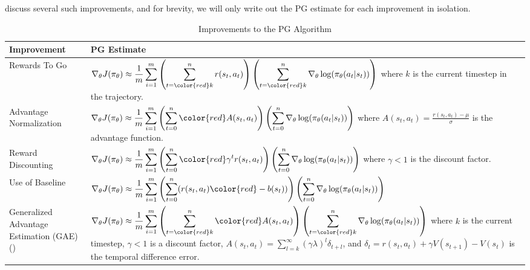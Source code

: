 \documentclass{article} %
\begin{document}
\cite{Levine-et-al-2023} discuss several such improvements, and for brevity,
we will only write out the PG estimate for each improvement in isolation.
\begin{table}[h]
    \centering
    \begin{tabular}{p{} p{}}
        \toprule
        Improvement & PG Estimate \\
        \midrule
        Rewards To Go & 
        $\displaystyle \nabla_\theta J(\pi_\theta) \approx \frac{1}{m} \sum_{i=1}^{m} \left(\sum_{t={\color{red} k}}^{n} r(s_t, a_t)\right) \left( \sum_{t={\color{red} k}}^{n} \nabla_\theta \log(\pi_\theta(a_t | s_t)) \right)$ \newline
        where $k$ is the current timestep in the trajectory. \\
        \midrule
        Advantage Normalization & 
        $\displaystyle \nabla_\theta J(\pi_\theta) \approx \frac{1}{m} \sum_{i=1}^{m} \left(\sum_{t=0}^{n} {\color{red} A(s_t, a_t)} \right) \left( \sum_{t=0}^{n} \nabla_\theta \log(\pi_\theta(a_t | s_t)) \right)$ \newline
        where $A(s_t, a_t) = \frac{r(s_t, a_t) - \mu}{\sigma}$ is the advantage function. \\
        \midrule
        Reward Discounting & 
        $\displaystyle \nabla_\theta J(\pi_\theta) \approx \frac{1}{m} \sum_{i=1}^{m} \left(\sum_{t=0}^{n} {\color{red} \gamma^t} r(s_t, a_t)\right) \left( \sum_{t=0}^{n} \nabla_\theta \log(\pi_\theta(a_t | s_t)) \right)$ \newline
        where $\gamma < 1$ is the discount factor. \\
        \midrule
        Use of Baseline & 
        $\displaystyle \nabla_\theta J(\pi_\theta) \approx \frac{1}{m} \sum_{i=1}^{m} \left(\sum_{t=0}^{n} (r(s_t, a_t) {\color{red} - b(s_t)})\right) \left( \sum_{t=0}^{n} \nabla_\theta \log(\pi_\theta(a_t | s_t)) \right)$ \newline
        \\ 
        \midrule
        Generalized Advantage Estimation (GAE) (\cite{Schulman-et-al-2018}) & 
        $\displaystyle \nabla_\theta J(\pi_\theta) \approx \frac{1}{m} \sum_{i=1}^{m} \left(\sum_{t={\color{red} k}}^{n} {\color{red} A(s_t, a_t)}\right) \left( \sum_{t={\color{red} k}}^{n} \nabla_\theta \log(\pi_\theta(a_t | s_t)) \right)$ \newline 
        where $k$ is the current timestep, $\gamma < 1$ is a discount factor, $A(s_t, a_t) = \sum_{l=k}^{\infty} (\gamma \lambda)^l \delta_{t + l}$, and $\delta_t = r(s_t, a_t) + \gamma V(s_{t + 1}) - V(s_t)$ is the temporal difference error. \\
        \bottomrule
    \end{tabular}
    \caption{Improvements to the PG Algorithm}
    \label{tab:pg_improvements}
\end{table}
\end{document}
